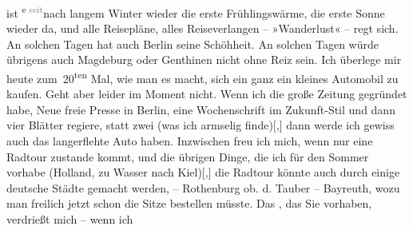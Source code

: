 \begin{ledgroupsized}[t]{13cm}
               ist \substVorne{}\textsuperscript{e \textcolor{gray}{seit}}{\allowbreak}\substDazwischen{}nach\substHinten{} langem Winter wieder die erste Frühlingswärme, die erste Sonne wieder da,
               und alle Reisepläne, alles Reiseverlangen – »Wanderlust« – regt sich. An solchen
               Tagen hat auch Berlin seine Schöhheit. An solchen
               Tagen würde übrigens auch Magdeburg oder Genthinen nicht ohne Reiz sein. Ich überlege mir
               heute zum 20\textsuperscript{ten} Mal, wie man es macht, sich ein ganz ein
               kleines Automobil zu kaufen. Geht aber leider im Moment nicht. Wenn ich die große
               Zeitung gegründet habe, Neue freie Presse in Berlin, eine Wochenschrift im Zukunft-Stil und dann vier Blätter regiere, statt zwei (was ich armselig
                  finde){[},{]} dann werde ich gewiss auch das langerflehte Auto
               haben. Inzwischen freu ich mich, wenn nur eine Radtour zustande kommt, und die
               übrigen Dinge, die ich für den Sommer vorhabe (Holland, zu Wasser nach Kiel){[},{]} die Radtour könnte auch durch einige deutsche Städte gemacht werden,
               – Rothenburg ob. d. Tauber – Bayreuth, wozu man freilich jetzt schon die Sitze bestellen
               müsste. Das \label{K_L03416-3v}\label{K_L03416-3h}, das Sie vorhaben, verdrießt mich – wenn ich

\end{ledgroupsized}
